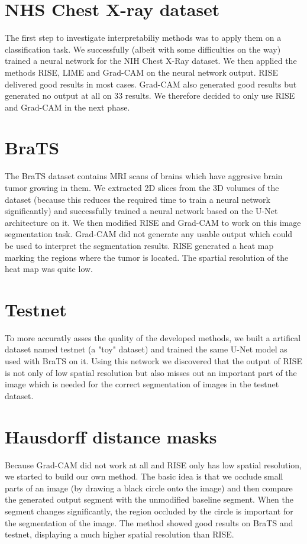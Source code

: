 \section{NHS Chest X-ray dataset}
The first step to investigate interpretabiliy methods was to apply them on a classification task.
We successfully (albeit with some difficulties on the way) trained a neural network for the NIH Chest X-Ray dataset.
We then applied the methods RISE, LIME and Grad-CAM on the neural network output. RISE delivered good results in most cases.
Grad-CAM also generated good results but generated no output at all on 33%
results. We therefore decided to only use RISE and Grad-CAM in the next phase.

\section{BraTS}
The BraTS dataset contains MRI scans of brains which have aggresive brain tumor growing in them. We extracted 2D slices from the 3D volumes of the dataset (because this reduces the required time to train a neural network significantly) and successfully trained a neural network based on the U-Net architecture on it. We then modified RISE and Grad-CAM to work on this image segmentation task. Grad-CAM did not generate any usable output which could be used to interpret the segmentation results. RISE generated a heat map marking the regions where the tumor is located. The spartial resolution of the heat map was quite low.

\section{Testnet}
To more accuratly asses the quality of the developed methods, we built a artifical dataset named testnet (a "toy" dataset) and trained the same U-Net model as used with BraTS on it. Using this network we discovered that the output of RISE is not only of low spatial resolution but also misses out an important part of the image which is needed for the correct segmentation of images in the testnet dataset.

\section{Hausdorff distance masks}
Because Grad-CAM did not work at all and RISE only has low spatial resolution, we started to build our own method. 
The basic idea is that we occlude small parts of an image (by drawing a black circle onto the image) and then compare the generated output segment with the unmodified baseline segment. When the segment changes significantly, the region occluded by the circle is important for the segmentation of the image.
The method showed good results on BraTS and testnet, displaying a much higher spatial resolution than RISE.

